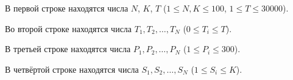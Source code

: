 В первой строке находятся числа $N$, $K$, $T$ ($1 \le N, K \le 100$, $1 \le T \le 30000$).

Во второй строке находятся числа $T_1, T_2, \ldots, T_N$ ($0 \le T_i \le T$).

В третьей строке находятся числа $P_1, P_2, \ldots, P_N$ ($1 \le P_i \le 300$).

В четвёртой строке находятся числа $S_1, S_2, \ldots, S_N$ ($1 \le S_i \le K$).